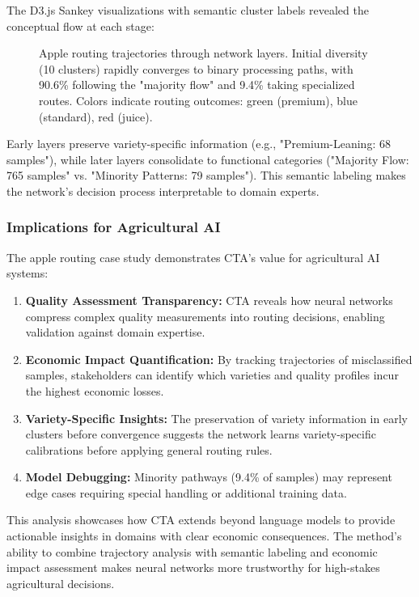 The D3.js Sankey visualizations with semantic cluster labels revealed the conceptual flow at each stage:

\begin{figure}[h]
\centering
\caption{Apple routing trajectories through network layers. Initial diversity (10 clusters) rapidly converges to binary processing paths, with 90.6\% following the "majority flow" and 9.4\% taking specialized routes. Colors indicate routing outcomes: green (premium), blue (standard), red (juice).}
\label{fig:apple_sankey}
\end{figure}

Early layers preserve variety-specific information (e.g., "Premium-Leaning: 68 samples"), while later layers consolidate to functional categories ("Majority Flow: 765 samples" vs. "Minority Patterns: 79 samples"). This semantic labeling makes the network's decision process interpretable to domain experts.

\subsubsection{Implications for Agricultural AI}

The apple routing case study demonstrates CTA's value for agricultural AI systems:

\begin{enumerate}
    \item \textbf{Quality Assessment Transparency:} CTA reveals how neural networks compress complex quality measurements into routing decisions, enabling validation against domain expertise.
    
    \item \textbf{Economic Impact Quantification:} By tracking trajectories of misclassified samples, stakeholders can identify which varieties and quality profiles incur the highest economic losses.
    
    \item \textbf{Variety-Specific Insights:} The preservation of variety information in early clusters before convergence suggests the network learns variety-specific calibrations before applying general routing rules.
    
    \item \textbf{Model Debugging:} Minority pathways (9.4\% of samples) may represent edge cases requiring special handling or additional training data.
\end{enumerate}

This analysis showcases how CTA extends beyond language models to provide actionable insights in domains with clear economic consequences. The method's ability to combine trajectory analysis with semantic labeling and economic impact assessment makes neural networks more trustworthy for high-stakes agricultural decisions.